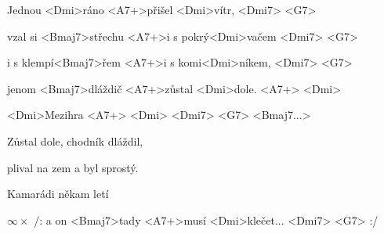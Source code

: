 

\zs
Jednou <Dmi>ráno <A7+>přišel <Dmi>vítr, <Dmi7> <G7>

vzal si <Bmaj7>střechu <A7+>i s pokrý<Dmi>vačem <Dmi7> <G7>

i s klempí<Bmaj7>řem <A7+>i s komi<Dmi>níkem, <Dmi7> <G7>

jenom <Bmaj7>dláždič <A7+>zůstal <Dmi>dole. <A7+> <Dmi>
\ks

<Dmi>Mezihra <A7+> <Dmi> <Dmi7> <G7> <Bmaj7...>

\zs
Zůstal dole, chodník dláždil,

plival na zem a byl sprostý.

Kamarádi někam letí

$\infty\times$ /: a on <Bmaj7>tady <A7+>musí <Dmi>klečet... 
<Dmi7> <G7> :/
\ks

\kp





